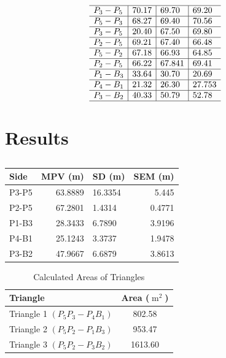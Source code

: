 \documentclass[12pt]{report}
\begin{document}
\[
\begin{aligned}
&\begin{array}{l|l|l|l}
\hline P_3-P_5 & 70.17 & 69.70 & 69.20 \\
\hline P_5-P_3 & 68.27 & 69.40 & 70.56 \\
\hline P_3-P_5 & 20.40 & 67.50 & 69.80 \\
\hline P_2-P_5 & 69.21 & 67.40 & 66.48 \\
\hline P_5-P_2 & 67.18 & 66.93 & 64.85 \\
\hline P_2-P_5 & 66.22 & 67.841 & 69.41 \\
\hline P_1-B_3 & 33.64 & 30.70 & 20.69 \\
\hline P_4-B_1 & 21.32 & 26.30 & 27.753 \\
\hline P_3-B_2 & 40.33 & 50.79 & 52.78 \\
\hline
\end{array}
\end{aligned}
\]



\section*{Results}

\begin{table}[ht!]
\caption{}
    \centering
    \begin{tabular}{lrlr}
    \toprule
     Side   &   MPV (m) & SD (m) &   SEM (m) \\
    \midrule
     P3-P5  &   63.8889 & 16.3354 &  5.445  \\
     P2-P5  &   67.2801 & 1.4314 &  0.4771 \\
     P1-B3  &   28.3433 & 6.7890  &  3.9196  \\
     P4-B1  &   25.1243 & 3.3737   &  1.9478  \\
     P3-B2  &   47.9667 & 6.6879  &  3.8613 \\
    \bottomrule
    \end{tabular}

\end{table}



\begin{table}[h!]
\centering
\caption{Calculated Areas of Triangles}
\label{tab:triangle_areas}
\begin{tabular}{@{}lc@{}}
\toprule
Triangle & Area (\(\operatorname{m}^2\)) \\ \midrule
Triangle 1 $(P_5P_3-P_4B_1)$ & 802.58 \\
Triangle 2 $(P_5P_2-P_1B_3)$ & 953.47 \\
Triangle 3 $(P_5P_2-P_3B_2)$ & 1613.60 \\ \bottomrule
\end{tabular}
\end{table}
\end{document}
